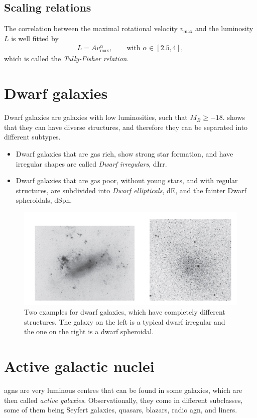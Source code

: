 \subsection{Scaling relations}
The correlation between the maximal rotational velocity $v_\text{max}$ and the luminosity $L$ is well fitted by
\begin{align*}
	L = A v_\text{max}^\alpha, 
	\qquad \text{with } \alpha \in [2.5, 4],
\end{align*}
which is called the \emph{Tully-Fisher relation}.




\section{Dwarf galaxies}
Dwarf galaxies are galaxies with low luminosities, such that $M_B \geq - 18$.
 shows that they can have diverse structures, and therefore they can be separated into different subtypes.
\begin{itemize}
	\item Dwarf galaxies that are gas rich, show strong star formation, and have irregular shapes are called \emph{Dwarf irregulars}, dIrr.
	\item Dwarf galaxies that are gas poor, without young stars, and with regular structures, are subdivided into \emph{Dwarf ellipticals}, dE, and the fainter Dwarf spheroidals, dSph.
\end{itemize}

\begin{figure}
	\includegraphics[width=\textwidth]{img/ch-05/dwarfs.PNG}
	\caption{Two examples for dwarf galaxies, which have completely different structures. The galaxy on the left is a typical dwarf irregular and the one on the right is a dwarf spheroidal.}
	\label{fig:dwarfs}
\end{figure}


\section{Active galactic nuclei}
\Acp{agn} are very luminous centres that can be found in some galaxies, which are then called \emph{active galaxies}.
Observationally, they come in different subclasses, some of them being Seyfert galaxies, quasars, blazars, radio \ac{agn}, and liners.

